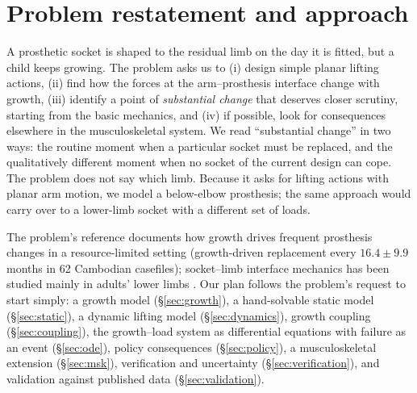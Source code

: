 \documentclass[11pt]{article}
\begin{document}
\section{Problem restatement and approach}
A prosthetic socket is shaped to the residual limb on the day it is fitted, but a child keeps growing. The problem asks us to (i) design simple planar lifting actions, (ii) find how the forces at the arm--prosthesis interface change with growth, (iii) identify a point of \emph{substantial change} that deserves closer scrutiny, starting from the basic mechanics, and (iv) if possible, look for consequences elsewhere in the musculoskeletal system. We read ``substantial change'' in two ways: the routine moment when a particular socket must be replaced, and the qualitatively different moment when no socket of the current design can cope. The problem does not say which limb. Because it asks for lifting actions with planar arm motion, we model a below-elbow prosthesis; the same approach would carry over to a lower-limb socket with a different set of loads.

The problem's reference \citep{ghidini2025} documents how growth drives frequent prosthesis changes in a resource-limited setting (growth-driven replacement every $16.4\pm9.9$ months in 62 Cambodian casefiles); socket--limb interface mechanics has been studied mainly in adults' lower limbs \citep{mak2001}. Our plan follows the problem's request to start simply: a growth model (\S\ref{sec:growth}), a hand-solvable static model (\S\ref{sec:static}), a dynamic lifting model (\S\ref{sec:dynamics}), growth coupling (\S\ref{sec:coupling}), the growth--load system as differential equations with failure as an event (\S\ref{sec:ode}), policy consequences (\S\ref{sec:policy}), a musculoskeletal extension (\S\ref{sec:msk}), verification and uncertainty (\S\ref{sec:verification}), and validation against published data (\S\ref{sec:validation}).
\end{document}
